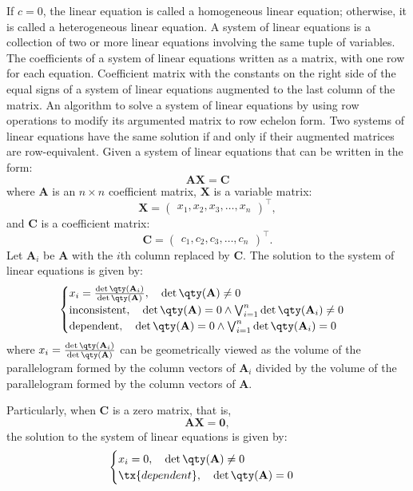 \documentclass[a4paper,12pt]{report}
\begin{document}
If $c=0$, the linear equation is called a homogeneous linear equation; otherwise, it is called a heterogeneous linear equation.
A system of linear equations is a collection of two or more linear equations involving the same tuple of variables.
The coefficients of a system of linear equations written as a matrix, with one row for each equation.
Coefficient matrix with the constants on the right side of the equal signs of a system of linear equations augmented to the last column of the matrix.
An algorithm to solve a system of linear equations by using row operations to modify its argumented matrix to row echelon form. Two systems of linear equations have the same solution if and only if their augmented matrices are row-equivalent.
Given a system of linear equations that can be written in the form:
\[\mathbf{A}\mathbf{X}=\mathbf{C}\]
where $\mathbf{A}$ is an $n\times n$ coefficient matrix, $\mathbf{X}$ is a variable matrix:
\[\mathbf{X}=\begin{pmatrix}x_1, x_2, x_3, \ldots, x_n\end{pmatrix}^\top,\]
and $\mathbf{C}$ is a coefficient matrix:
\[\mathbf{C}=\begin{pmatrix}c_1, c_2, c_3, \ldots, c_n\end{pmatrix}^\top.\]
Let \(\mathbf{A}_i\) be $\mathbf{A}$ with the \(i\)th column replaced by \(\mathbf{C}\). The solution to the system of linear equations is given by:
\[\begin{cases}
x_i=\frac{\det\qty(\mathbf{A}_i)}{\det\qty(\mathbf{A})},\quad\det\qty(\mathbf{A})\neq 0\\
\text{inconsistent},\quad\det\qty(\mathbf{A})=0\land\bigvee_{i=1}^n\det\qty(\mathbf{A}_i)\neq 0\\
\text{dependent},\quad\det\qty(\mathbf{A})=0\land\bigvee_{i=1}^n\det\qty(\mathbf{A}_i)=0
\end{cases}\]
where $x_i=\frac{\det\qty(\mathbf{A}_i)}{\det\qty(\mathbf{A})}$ can be geometrically viewed as the volume of the parallelogram formed by the column vectors of $\mathbf{A}_i$ divided by the volume of the parallelogram formed by the column vectors of $\mathbf{A}$.

Particularly, when $\mathbf{C}$ is a zero matrix, that is,
\[\mathbf{A}\mathbf{X}=\mathbf{0},\]
the solution to the system of linear equations is given by:
\[\begin{cases}
x_i=0,\quad\det\qty(\mathbf{A})\neq 0\\
\tx{dependent},\quad\det\qty(\mathbf{A})=0
\end{cases}\]
\end{document}
